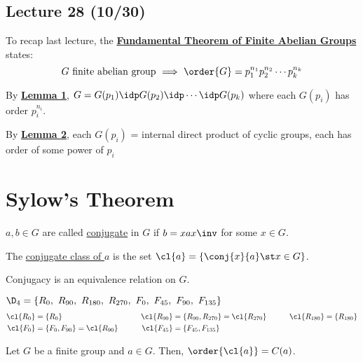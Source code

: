 \subsection*{Lecture 28 (10/30)} %

To recap last lecture, the \ul{\textbf{Fundamental Theorem of Finite Abelian Groups}} states:
\[\text{\(G\) finite abelian group \(\implies\) \(\order{G} = p_1^{n_1}p_2^{n_2}\cdots p_k^{n_k}\)}\]

By \ul{\textbf{Lemma 1}}, \(G = G(p_1) \idp G(p_2) \idp \cdots \idp G(p_k)\) where each \(G(p_i)\) has order \(p_i^{n_i}\).

By \ul{\textbf{Lemma 2}}, each \(G(p_i)\) = internal direct product of cyclic groups, each has order of some power of \(p_i\)

\setcounter{section}{23}
\section{Sylow's Theorem}

\begin{definition}

    \(a,b\in G\) are called \ul{conjugate} in \(G\) if \(b=xax\inv\) for some \(x\in G\).

    The \ul{conjugate class of \(a\)} is the set \(\cl{a} = \{\conj{x}{a} \st x\in G\}\).
\end{definition}

\begin{remark}
    Conjugacy is an equivalence relation on \(G\).
\end{remark}

\begin{example}
    \(\D_4 = \{ R_{0},\  R_{90},\  R_{180},\  R_{270},\  F_{0},\  F_{45},\ F_{90},\ F_{135} \}\)
    \begin{align*}
        \cl{R_{0}} &= \{R_{0}\} \qquad & \cl{R_{90}}&=\{R_{90}, R_{270}\} = \cl{R_{270}} \qquad & \cl{R_{180}} &= \{R_{180}\} \\
            \cl{F_{0}} &= \{F_{0}, F_{90}\} = \cl{R_{90}} \qquad & \cl{F_{45}} &= \{F_{45}, F_{135}\}
    \end{align*}
\end{example}

\begin{theorem}[24.1]
    Let \(G\) be a finite group and \(a\in G\). Then, \(\order{\cl{a}}=\index{G}{C(a)}\).
\end{theorem}

